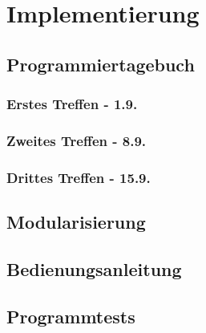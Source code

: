 \chapter{Implementierung}

\section{Programmiertagebuch}

\subsection{Erstes Treffen - 1.9.}

\subsection{Zweites Treffen - 8.9.}

\subsection{Drittes Treffen - 15.9.}

\section{Modularisierung}

\section{Bedienungsanleitung}

\section{Programmtests}